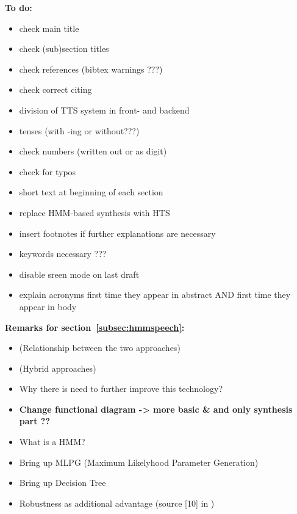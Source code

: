 \vspace{2em}
\textbf{\large To do:}
\vspace{1em}
\begin{itemize}[leftmargin=10pt]
	\item check main title
	\item check (sub)section titles
	\item check references (bibtex warnings ???)
	\item check correct citing
	\item division of TTS system in front- and backend
	\item tenses (with -ing or without???)
	\item check numbers (written out or as digit)
	\item check for typos
	\item short text at beginning of each section
	\item replace HMM-based synthesis with HTS
	\item insert footnotes if further explanations are necessary
	\item keywords necessary ???
	\item disable sreen mode on last draft
	\item explain acronyms first time they appear in abstract AND first time they appear in body
\end{itemize}

\vspace{2em}
\textbf{\large Remarks for section~\ref{subsec:hmmspeech}:}
\vspace{1em}
\begin{itemize}[leftmargin=10pt]
	\item (Relationship between the two approaches)
	\item (Hybrid approaches)
	\item Why there is need to further improve this technology?
	\item \textbf{Change functional diagram -> more basic \& and only synthesis part ??}
	\item What is a HMM?
	\item Bring up MLPG (Maximum Likelyhood Parameter Generation)
	\item Bring up Decision Tree
	\item Robustness as additional advantage (source [10] in \cite{zen:deepstatistical})
\end{itemize}

\newpage

